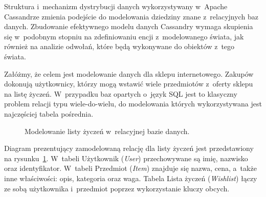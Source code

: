 Struktura i~mechanizm dystrybucji danych wykorzystywany w~Apache Cassandrze zmienia podejście do modelowania dziedziny znane z~relacyjnych baz danych. Zbudowanie efektywnego modelu danych Cassandry wymaga skupienia się w~podobnym stopniu na zdefiniowaniu encji z~modelowanego świata, jak również na analizie odwołań, które będą wykonywane do obiektów z~tego świata.~\cite{modeling_best_practices_pt_1}

Załóżmy, że celem jest modelowanie danych dla sklepu internetowego. Zakupów dokonują użytkownicy, którzy mogą wstawić wiele przedmiotów z~oferty sklepu na listę życzeń. W~przypadku baz opartych o~język SQL jest to klasyczny problem relacji typu wiele-do-wielu, do modelowania których wykorzystywana jest najczęściej tabela pośrednia. 

\begin{figure}[ht!]
	\centering

	\caption{Modelowanie listy życzeń w~relacyjnej bazie danych.}
	\label{fig:er_wishlist}
\end{figure}

Diagram prezentujący zamodelowaną relację dla listy życzeń jest przedstawiony na rysunku~\ref{fig:er_wishlist}. W~tabeli Użytkownik (\emph{User}) przechowywane są imię, nazwisko oraz identyfikator. W~tabeli Przedmiot (\emph{Item}) znajduje się nazwa, cena, a~także inne właściwości: opis, kategoria oraz waga. Tabela Lista życzeń (\emph{Wishlist}) łączy ze sobą użytkownika i~przedmiot poprzez wykorzystanie kluczy obcych. 

